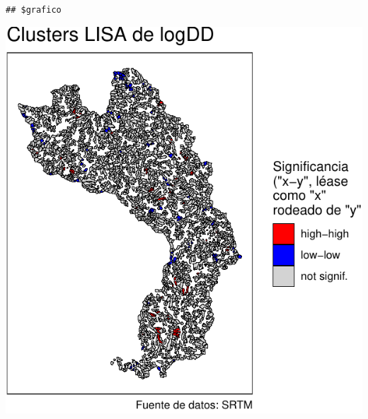 \documentclass[11pt,]{article}
\begin{document}
\begin{verbatim}
## $grafico
\end{verbatim}

\includegraphics{proyecto_f_files/figure-latex/unnamed-chunk-72-4.pdf}
\end{document}
